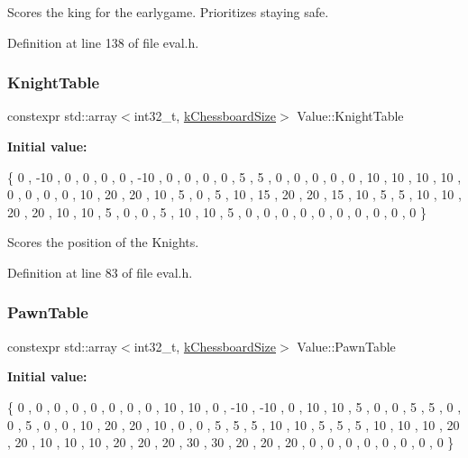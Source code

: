 Scores the king for the earlygame. Prioritizes staying safe. 



Definition at line 138 of file eval.\+h.

\mbox{\label{namespaceValue_a4b65a409f1e288260d4e71d6c13376b5}} 
\subsubsection{\texorpdfstring{Knight\+Table}{KnightTable}}
{\footnotesize\ttfamily constexpr std\+::array$<$int32\+\_\+t, \mbox{\hyperlink{constants_8h_a901d7bb0bf36a71e09079f9dd4168c4c}{k\+Chessboard\+Size}}$>$ Value\+::\+Knight\+Table}

{\bfseries Initial value\+:}
\begin{DoxyCode}
\{
        0   ,   -10 ,   0   ,   0   ,   0   ,   0   ,   -10 ,   0   ,
        0   ,   0   ,   0   ,   5   ,   5   ,   0   ,   0   ,   0   ,
        0   ,   0   ,   10  ,   10  ,   10  ,   10  ,   0   ,   0   ,
        0   ,   0   ,   10  ,   20  ,   20  ,   10  ,   5   ,   0   ,
        5   ,   10  ,   15  ,   20  ,   20  ,   15  ,   10  ,   5   ,
        5   ,   10  ,   10  ,   20  ,   20  ,   10  ,   10  ,   5   ,
        0   ,   0   ,   5   ,   10  ,   10  ,   5   ,   0   ,   0   ,
        0   ,   0   ,   0   ,   0   ,   0   ,   0   ,   0   ,   0       
    \}
\end{DoxyCode}


Scores the position of the Knights. 



Definition at line 83 of file eval.\+h.

\mbox{\label{namespaceValue_a8b6c72010096d1ae9eb653c5be418db0}} 
\subsubsection{\texorpdfstring{Pawn\+Table}{PawnTable}}
{\footnotesize\ttfamily constexpr std\+::array$<$int32\+\_\+t, \mbox{\hyperlink{constants_8h_a901d7bb0bf36a71e09079f9dd4168c4c}{k\+Chessboard\+Size}}$>$ Value\+::\+Pawn\+Table}

{\bfseries Initial value\+:}
\begin{DoxyCode}
\{
        0   ,   0   ,   0   ,   0   ,   0   ,   0   ,   0   ,   0   ,
        10  ,   10  ,   0   ,   -10 ,   -10 ,   0   ,   10  ,   10  ,
        5   ,   0   ,   0   ,   5   ,   5   ,   0   ,   0   ,   5   ,
        0   ,   0   ,   10  ,   20  ,   20  ,   10  ,   0   ,   0   ,
        5   ,   5   ,   5   ,   10  ,   10  ,   5   ,   5   ,   5   ,
        10  ,   10  ,   10  ,   20  ,   20  ,   10  ,   10  ,   10  ,
        20  ,   20  ,   20  ,   30  ,   30  ,   20  ,   20  ,   20  ,
        0   ,   0   ,   0   ,   0   ,   0   ,   0   ,   0   ,   0   
    \}
\end{DoxyCode}


